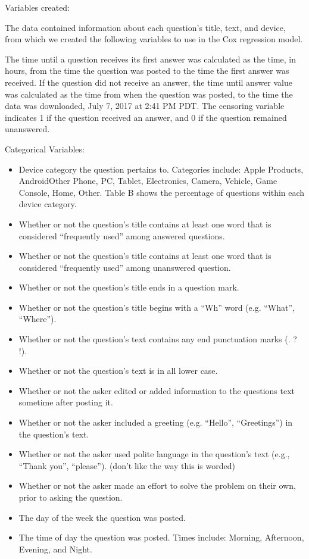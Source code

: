 \documentclass[12pt]{article}
\begin{document}
    Variables created: 
    
    The data contained information about each question's title, text, and device, from which we created the following variables to use in the Cox regression model. 

The time until a question receives its first answer was calculated as the time, in hours, from the time the question was posted to the time the first answer was received. If the question did not receive an answer, the time until answer value was calculated as the time from when the question was posted, to the time the data was downloaded, July 7, 2017 at 2:41 PM PDT. The censoring variable indicates 1 if the question received an answer, and 0 if the question remained unanswered.

Categorical Variables: 

\begin{itemize}
  \item Device category the question pertains to. Categories include: Apple Products, Android\/Other Phone, PC, Tablet, Electronics, Camera, Vehicle, Game Console, Home, Other. Table B shows the percentage of questions within each device category. 
  \item Whether or not the question's title contains at least one word that is considered ``frequently used'' among answered questions.
  \item Whether or not the question's title contains at least one word that is considered ``frequently used'' among unanswered question. 
  \item Whether or not the question's title ends in a question mark.
  \item Whether or not the question's title begins with a ``Wh'' word (e.g. ``What'', ``Where''). 
  \item Whether or not the question's text contains any end punctuation marks (. ? !). 
  \item Whether or not the question's text is in all lower case. 
  \item Whether or not the asker edited or added information to the questions text sometime after posting it. 
  \item Whether or not the asker included a greeting (e.g. ``Hello'', ``Greetings'') in the question's text.
  \item Whether or not the asker used polite language in the question's text (e.g., ``Thank you'', ``please''). (don't like the way this is worded) 
  \item Whether or not the asker made an effort to solve the problem on their own, prior to asking the question.
  \item The day of the week the question was posted. 
  \item The time of day the question was posted. Times include: Morning, Afternoon, Evening, and Night. 
\end{itemize}
\end{document}
